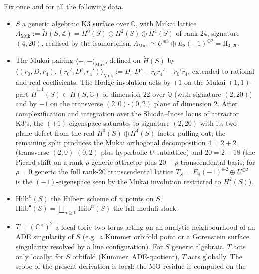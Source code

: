 Fix once and for all the following data.

\begin{itemize}
\item $S$ a generic algebraic K3 surface over $\mathbb C$, with
      Mukai lattice
      $\Lambda_{\mathrm{Muk}} := \widetilde H(S, \mathbb Z)
         = H^{0}(S) \oplus H^{2}(S) \oplus H^{4}(S)$
      of rank $24$, signature $(4, 20)$, realised by the isomorphism
      $\Lambda_{\mathrm{Muk}} \simeq U^{\oplus 3} \oplus E_{8}(-1)^{\oplus 2}
       = \mathrm{II}_{4, 20}$.
\item The Mukai pairing
      $\langle -, - \rangle_{\mathrm{Muk}}$, defined on
      $\widetilde H(S)$ by
      $\langle (r_0, D, r_4), (r_0', D', r_4') \rangle_{\mathrm{Muk}}
       := D \cdot D' - r_0 r_4' - r_0' r_4$, extended to rational and
      real coefficients.  The Hodge involution acts by $+1$ on the
      Mukai $(1,1)$-part
      $\widetilde H^{1,1}(S) \subset \widetilde H(S, \mathbb C)$ of
      dimension $22$ over $\mathbb Q$ (with signature $(2, 20)$) and
      by $-1$ on the transverse $(2, 0)$-$(0, 2)$ plane of
      dimension $2$.  After complexification and integration over the
      Shioda--Inose locus of attractor K3's, the $(+1)$-eigenspace
      saturates to signature $(2, 20)$ with its two-plane defect from
      the real $H^{0}(S) \oplus H^{4}(S)$ factor pulling out; the
      remaining split produces the Mukai orthogonal decomposition
      $4 = 2 + 2$ (transverse $(2, 0)$-$(0, 2)$ plus hyperbolic
      $U$-sublattice) and $20 = 2 + 18$ (the Picard shift on a
      rank-$\rho$ generic attractor plus $20 - \rho$ transcendental
      basis; for $\rho = 0$ generic the full rank-$20$ transcendental
      lattice $T_{S} = E_{8}(-1)^{\oplus 2} \oplus U^{\oplus 2}$ is
      the $(-1)$-eigenspace seen by the Mukai involution restricted
      to $H^{2}(S)$).
\item $\mathrm{Hilb}^{n}(S)$ the Hilbert scheme of $n$ points on $S$;
      $\mathrm{Hilb}^{\bullet}(S) = \bigsqcup_{n \geq 0}
      \mathrm{Hilb}^{n}(S)$ the full moduli stack.
\item $T = (\mathbb C^{\times})^{2}$ a local toric two-torus acting
      on an analytic neighbourhood of an ADE singularity of $S$
      (e.g.\ a Kummer orbifold point or a Gorenstein surface
      singularity resolved by a line configuration).  For $S$ generic
      algebraic, $T$ acts only locally; for $S$ orbifold (Kummer,
      ADE-quotient), $T$ acts globally.  The scope of the present
      derivation is local: the MO residue is computed on the

\end{itemize}
